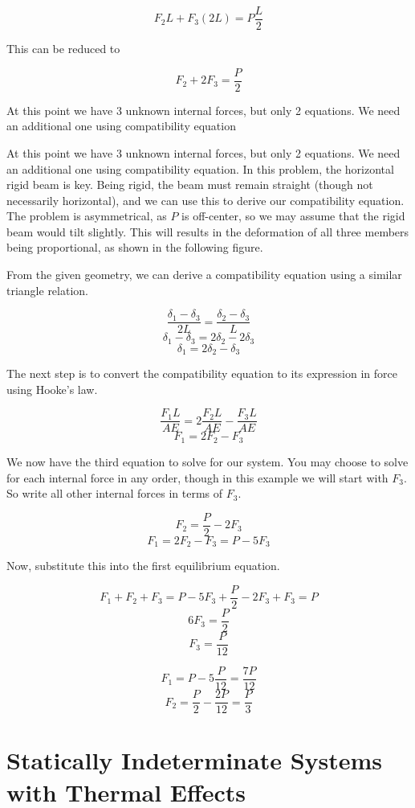 \documentclass[
fontsize=10pt,
a4paper,
twosides=false,
open=any,
svgnames,
]{kaobook} %
\begin{document}
\begin{example}
 $$ F_2 L + F_3 (2L) = P \frac{L}{2} $$

 This can be reduced to 

 $$ F_2 + 2F_3 = \frac{P}{2} $$

 At this point we have 3 unknown internal forces, but only 2 equations. We need an additional one using compatibility equation

 At this point we have 3 unknown internal forces, but only 2 equations. We need an additional one using compatibility equation. In this problem, the horizontal rigid beam is key. Being rigid, the beam must remain straight (though not necessarily horizontal), and we can use this to derive our compatibility equation. The problem is asymmetrical, as $P$ is off-center, so we may assume that the rigid beam would tilt slightly. This will results in the deformation of all three members being proportional, as shown in the following figure.


 From the given geometry, we can derive a compatibility equation using a similar triangle relation.

 $$ \frac{\delta_1 - \delta_3}{2L} = \frac{\delta_2 - \delta_3}{L} $$
 $$ \delta_1 - \delta_3 = 2\delta_2 - 2\delta_3 $$
 $$ \delta_1 = 2\delta_2 - \delta_3 $$

 The next step is to convert the compatibility equation to its expression in force using Hooke's law.

 $$ \frac{F_1 L}{AE} = 2\frac{F_2 L}{AE} - \frac{F_3 L}{AE} $$
 $$ F_1 = 2F_2 - F_3 $$

 We now have the third equation to solve for our system. You may choose to solve for each internal force in any order, though in this example we will start with $F_3$. So write all other internal forces in terms of $F_3$.

 $$ F_2 = \frac{P}{2} - 2F_3 $$
 $$ F_1 = 2F_2 - F_3 = P - 5F_3 $$

 Now, substitute this into the first equilibrium equation.

 $$ F_1 + F_2 + F_3 = P - 5F_3 + \frac{P}{2} - 2F_3 + F_3 = P $$
 $$ 6F_3 = \frac{P}{2} $$
 $$ F_3 = \frac{P}{12} $$

 $$ F_1 = P - 5 \frac{P}{12} = \frac{7P}{12} $$
 $$ F_2 = \frac{P}{2} - \frac{2P}{12} = \frac{P}{3} $$
\end{example}


\section{Statically Indeterminate Systems with Thermal Effects}
\end{document}
